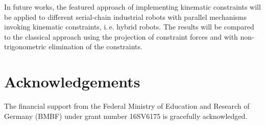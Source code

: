 \documentclass{svproc}
\begin{document}
In future works, the featured approach of implementing kinematic constraints will be applied to different serial-chain industrial robots with parallel mechanisms invoking kinematic constraints, i.\,e. hybrid robots. 
The results will be compared to the classical approach using the projection of constraint forces and with non-trigonometric elimination of the constraints.


%


\section*{Acknowledgements}

The financial support from the Federal Ministry of Education and Research
of Germany (BMBF) under grant number 16SV6175 is gracefully acknowledged.




\end{document}
